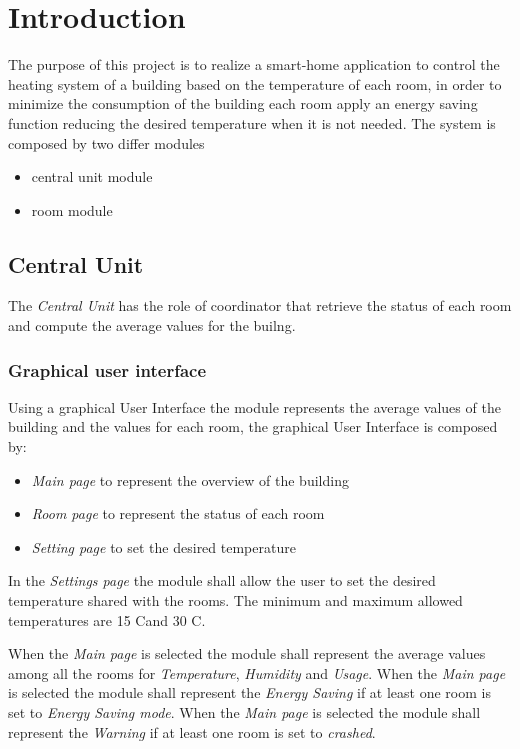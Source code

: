 \section{Introduction}
The purpose of this project is to realize a smart-home application to control the heating system of a building based on the temperature of each room, in order to minimize the consumption of the building each room apply an energy saving function reducing the desired temperature when it is not needed.
The system is composed by two differ modules
\begin{itemize}
	\item central unit module 
	\item room module
\end{itemize}

\subsection{Central Unit}
The \textit{Central Unit} has the role of coordinator that retrieve the status of each room and compute the average values for the builng.\\

\subsubsection{Graphical user interface}
Using a graphical User Interface the module represents the average values of the building and the values for each room, the graphical User Interface is composed by:
\begin{itemize}
	\item \textit{Main page} to represent the overview of the building
	\item \textit{Room page} to represent the status of each room
	\item \textit{Setting page} to set the desired temperature
\end{itemize}
In the \textit{Settings page} the module shall allow the user to set the desired temperature shared with the rooms.
The minimum and maximum allowed temperatures are 15 C\degree and 30 C\degree.

When the \textit{Main page} is selected the module shall represent the average values among all the rooms for \textit{Temperature}, \textit{Humidity} and \textit{Usage}.
When the \textit{Main page} is selected the module shall represent the \textit{Energy Saving} if at least one room is set to \textit{Energy Saving mode}.
When the \textit{Main page} is selected the module shall represent the \textit{Warning} if at least one room is set to \textit{crashed}.

